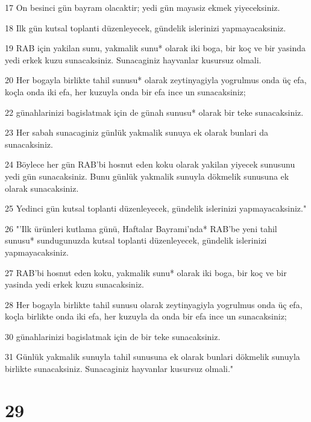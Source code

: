 \par 17 On besinci gün bayram olacaktir; yedi gün mayasiz ekmek yiyeceksiniz.
\par 18 Ilk gün kutsal toplanti düzenleyecek, gündelik islerinizi yapmayacaksiniz.
\par 19 RAB için yakilan sunu, yakmalik sunu* olarak iki boga, bir koç ve bir yasinda yedi erkek kuzu sunacaksiniz. Sunacaginiz hayvanlar kusursuz olmali.
\par 20 Her bogayla birlikte tahil sunusu* olarak zeytinyagiyla yogrulmus onda üç efa, koçla onda iki efa, her kuzuyla onda bir efa ince un sunacaksiniz;
\par 22 günahlarinizi bagislatmak için de günah sunusu* olarak bir teke sunacaksiniz.
\par 23 Her sabah sunacaginiz günlük yakmalik sunuya ek olarak bunlari da sunacaksiniz.
\par 24 Böylece her gün RAB'bi hosnut eden koku olarak yakilan yiyecek sunusunu yedi gün sunacaksiniz. Bunu günlük yakmalik sunuyla dökmelik sunusuna ek olarak sunacaksiniz.
\par 25 Yedinci gün kutsal toplanti düzenleyecek, gündelik islerinizi yapmayacaksiniz."
\par 26 "'Ilk ürünleri kutlama günü, Haftalar Bayrami'nda* RAB'be yeni tahil sunusu* sundugunuzda kutsal toplanti düzenleyecek, gündelik islerinizi yapmayacaksiniz.
\par 27 RAB'bi hosnut eden koku, yakmalik sunu* olarak iki boga, bir koç ve bir yasinda yedi erkek kuzu sunacaksiniz.
\par 28 Her bogayla birlikte tahil sunusu olarak zeytinyagiyla yogrulmus onda üç efa, koçla birlikte onda iki efa, her kuzuyla da onda bir efa ince un sunacaksiniz;
\par 30 günahlarinizi bagislatmak için de bir teke sunacaksiniz.
\par 31 Günlük yakmalik sunuyla tahil sunusuna ek olarak bunlari dökmelik sunuyla birlikte sunacaksiniz. Sunacaginiz hayvanlar kusursuz olmali."

\chapter{29}

